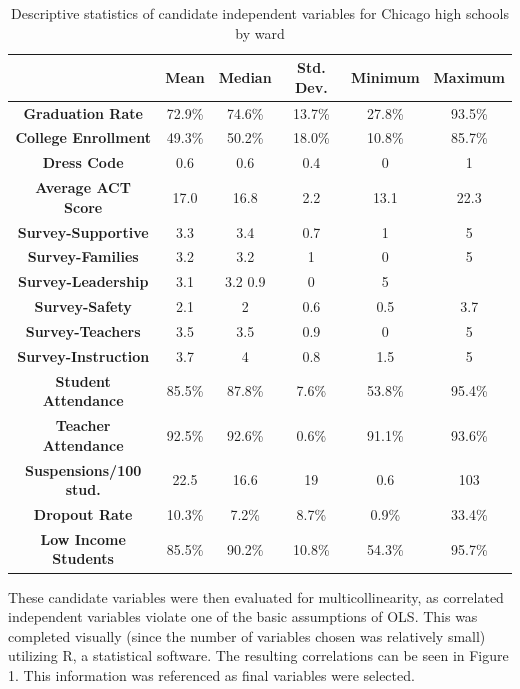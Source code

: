 \documentclass[12pt]{article}
\begin{document}
\begin{center}
	\begin{table}[h]
		\begin{tabular}{ c | c | c | c | c | c }
			
			& \textbf{Mean} & \textbf{Median} & \textbf{Std. Dev.} & \textbf{Minimum} & \textbf{Maximum} \\ 
			\hline
			\textbf{Graduation Rate} & 72.9\% & 74.6\% & 13.7\% & 27.8\% & 93.5\% \\
			\textbf{College Enrollment} & 49.3\% & 50.2\% & 18.0\% & 10.8\% & 85.7\% \\
			\textbf{Dress Code} & 0.6 & 0.6 & 0.4 & 0 & 1\\
			\textbf{Average ACT Score} & 17.0 & 16.8 & 2.2 & 13.1 & 22.3\\
			\textbf{Survey-Supportive} & 3.3 & 3.4 & 0.7 & 1 & 5\\
			\textbf{Survey-Families} & 3.2 & 3.2 & 1 & 0 & 5\\
			\textbf{Survey-Leadership} & 3.1 & 3.2 0.9 & 0 & 5\\
			\textbf{Survey-Safety} & 2.1 & 2 & 0.6 & 0.5 & 3.7\\
			\textbf{Survey-Teachers} & 3.5 & 3.5 & 0.9 & 0 & 5\\
			\textbf{Survey-Instruction} & 3.7 & 4 & 0.8 & 1.5 & 5\\
			\textbf{Student Attendance} & 85.5\% & 87.8\% & 7.6\% & 53.8\% & 95.4\% \\
			\textbf{Teacher Attendance} & 92.5\% & 92.6\% & 0.6\% & 91.1\% & 93.6\% \\
			\textbf{Suspensions/100 stud.} & 22.5 & 16.6 & 19 & 0.6 & 103\\
			\textbf{Dropout Rate} & 10.3\% & 7.2\% & 8.7\% & 0.9\% & 33.4\% \\
			\textbf{Low Income Students} & 85.5\% & 90.2\% & 10.8\% & 54.3\% & 95.7\% 
			
		\end{tabular}
		\caption{Descriptive statistics of candidate independent variables for Chicago high schools by ward}
	\end{table}
\end{center}

These candidate variables were then evaluated for multicollinearity, as correlated independent variables violate one of the basic assumptions of OLS.  This was completed visually (since the number of variables chosen was relatively small) utilizing R, a statistical software.  The resulting correlations can be seen in Figure 1.  This information was referenced as final variables were selected.
\end{document}
